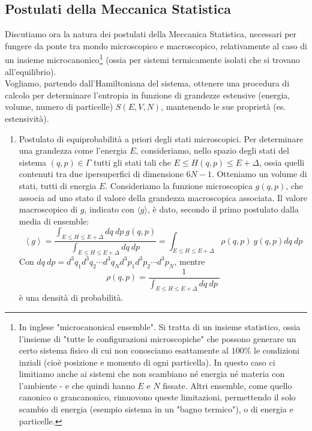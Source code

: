 \documentclass[../MeccanicaStatistica.tex]{subfiles}
\begin{document}
\subsection{Postulati della Meccanica Statistica}
Discutiamo ora la natura dei postulati della Meccanica Statistica, necessari per fungere da ponte tra mondo microscopico e macroscopico, relativamente al caso di un insieme microcanonico\footnote{In inglese "microcanonical ensemble". Si tratta di un insieme statistico, ossia l'insieme di "tutte le configurazioni microscopiche" che possono generare un certo sistema fisico di cui non conosciamo esattamente al $100\%$ le condizioni inziali (cioè posizione e momento di ogni particella). In questo caso ci limitiamo anche ai sistemi che non scambiano né energia né materia con l'ambiente - e che quindi hanno $E$ e $N$ fissate. Altri ensemble, come quello canonico o grancanonico, rimuovono queste limitazioni, permettendo il solo scambio di energia (esempio sistema in un "bagno termico"), o di energia e particelle.} (ossia per sistemi termicamente isolati che si trovano all'equilibrio).\\
Vogliamo, partendo dall'Hamiltoniana del sistema, ottenere una procedura di calcolo per determinare l'entropia in funzione di grandezze estensive (energia, volume, numero di particelle) $S(E,V,N)$, mantenendo le sue proprietà (es. estensività).
\begin{enumerate}
    \item Postulato di equiprobabilità a priori degli stati
    microscopici. Per determinare una grandezza come l'energia $E$, consideriamo, nello spazio degli stati del sistema $\left(q,p\right)\in \Gamma$ tutti gli stati tali che $E\leq H\left(q,p\right)\leq E+\Delta$, ossia quelli contenuti tra due ipersuperfici di dimensione $6N-1$. Otteniamo un volume di stati, tutti di energia $E$. Consideriamo la funzione microscopica $g\left(q,p\right)$, che associa ad uno stato il valore della grandezza macroscopica associata. Il valore macroscopico di $g$, indicato con $\langle g\rangle$, è dato, secondo il primo postulato dalla media di ensemble:
	\[ \left\langle g\right\rangle=\frac{\int_{E\le H\le E+\Delta}{dq\ dp\ g\left(q,p\right)}}{\int_{E\le H\le E+\Delta}{dq\ dp}}=\int_{E\le H\le E+\Delta}{\rho\left(q,p\right)\ g\left(q,p\right)dq\ dp}
	\]
    Con $dq\ dp=d^3q_1d^3q_2\cdots d^3q_Nd^3p_1d^3p_2\cdots d^3p_N$, mentre \[ \rho\left(q,p\right)=\frac{1}{\int_{E\le H\le E+\Delta}{dq\ dp\ }} \] è una densità di probabilità.
\end{enumerate}
\end{document}
